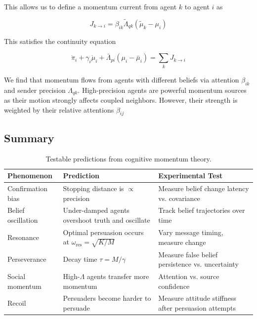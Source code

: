 \documentclass[12pt]{article}
\begin{document}
This allows us to define a momentum current from agent $k$ to agent $i$ as

\begin{equation}
J_{k\rightarrow i} = \beta_{ik}\tilde{\Lambda}_{qk}(\tilde{\mu}_k - \mu_i)
\end{equation}

This satisfies the continuity equation

\begin{equation}
\dot{\pi}_i + \gamma_i\dot{\mu}_i + \bar{\Lambda}_{pi}(\mu_i - \bar{\mu}_i) = \sum_k J_{k\rightarrow i}
\end{equation}

We find that momentum flows from agents with different beliefs via attention $\beta_{ik}$ and sender precision $\Lambda_{qk}$. High-precision agents are powerful momentum sources as their motion strongly affects coupled neighbors. However, their strength is weighted by their relative attentions $\beta_{ij}$

\subsection{Summary}

\begin{table}[ht]
\centering
\caption{Testable predictions from cognitive momentum theory.}
\label{tab:predictions}
\renewcommand{\arraystretch}{1.3}
\begin{tabular}{@{} p{3cm} p{5cm} p{5cm} @{}}
\toprule
\textbf{Phenomenon} & \textbf{Prediction} & \textbf{Experimental Test} \\
\midrule
Confirmation bias & Stopping distance is $\propto$ precision & Measure belief change latency vs. covariance \\[6pt]
Belief oscillation & Under-damped agents overshoot truth and oscillate & Track belief trajectories over time \\[6pt]
Resonance & Optimal persuasion occurs at $\omega_{\text{res}} = \sqrt{K/M}$ & Vary message timing, measure change \\[6pt]
Perseverance & Decay time $\tau = M/\gamma$ & Measure false belief persistence vs. uncertainty \\[6pt]
Social momentum & High-$\Lambda$ agents transfer more momentum & Attention vs. source confidence \\[6pt]
Recoil & Persuaders become harder to persuade & Measure attitude stiffness after persuasion attempts \\
\bottomrule
\end{tabular}
\end{table}
\end{document}
